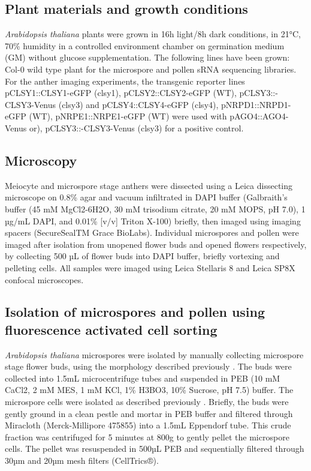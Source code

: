 \subsection{Plant materials and growth conditions}

\textit{Arabidopsis thaliana} plants were grown in 16h light/8h dark conditions, in 21°C, 70\% humidity in a controlled environment chamber on germination medium (GM) without glucose supplementation. The following lines have been grown: Col-0 wild type plant for the microspore and pollen sRNA sequencing libraries. For the anther imaging experiments, the transgenic reporter lines pCLSY1::CLSY1-eGFP (clsy1), pCLSY2::CLSY2-eGFP (WT), pCLSY3::-CLSY3-Venus (clsy3) and pCLSY4::CLSY4-eGFP (clsy4), pNRPD1::NRPD1-eGFP (WT), pNRPE1::NRPE1-eGFP (WT) were used with pAGO4::AGO4-Venus or), pCLSY3::-CLSY3-Venus (clsy3) for a positive control.

\subsection{Microscopy}

Meiocyte and microspore stage anthers were dissected using a Leica dissecting microscope on 0.8\% agar and vacuum infiltrated in DAPI buffer (Galbraith’s buffer (45 mM MgCl2-6H2O, 30 mM trisodium citrate, 20 mM MOPS, pH 7.0), 1 µg/mL DAPI, and 0.01\% [v/v] Triton X-100) briefly, then imaged using imaging spacers (SecureSealTM Grace BioLabs). Individual microspores and pollen were imaged after isolation from unopened flower buds and opened flowers respectively, by collecting 500 µL of flower buds into DAPI buffer, briefly vortexing and pelleting cells. All samples were imaged using Leica Stellaris 8 and Leica SP8X confocal microscopes.

\subsection{Isolation of microspores and pollen using fluorescence activated cell sorting}

\textit{Arabidopsis thaliana} microspores were isolated by manually collecting microspore stage flower buds, using the morphology described previously \cite{RN86}. The buds were collected into 1.5mL microcentrifuge tubes and suspended in PEB (10 mM CaCl2, 2 mM MES, 1 mM KCl, 1\% H3BO3, 10\% Sucrose, pH 7.5) buffer. The microspore cells were isolated as described previously \cite{RN140}. Briefly, the buds were gently ground in a clean pestle and mortar in PEB buffer and filtered through Miracloth (Merck-Millipore 475855) into a 1.5mL Eppendorf tube. This crude fraction was centrifuged for 5 minutes at 800g to gently pellet the microspore cells. The pellet was resuspended in 500µL PEB and sequentially filtered through 30µm and 20µm mesh filters (CellTrics®).

